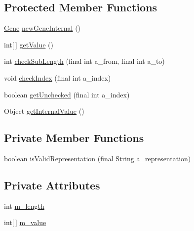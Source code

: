 \subsection*{Protected Member Functions}
\begin{DoxyCompactItemize}
\item 
\hyperlink{interfaceorg_1_1jgap_1_1_gene}{Gene} \hyperlink{classorg_1_1jgap_1_1impl_1_1_fixed_binary_gene_acf83c8bd879cbbcf3e091eaf718594be}{new\-Gene\-Internal} ()
\item 
int\mbox{[}$\,$\mbox{]} \hyperlink{classorg_1_1jgap_1_1impl_1_1_fixed_binary_gene_aeced77e3bafb3ffcbad495031e8566cd}{get\-Value} ()
\item 
int \hyperlink{classorg_1_1jgap_1_1impl_1_1_fixed_binary_gene_af37b97db39e23dda57af35e144d54468}{check\-Sub\-Length} (final int a\-\_\-from, final int a\-\_\-to)
\item 
void \hyperlink{classorg_1_1jgap_1_1impl_1_1_fixed_binary_gene_a605be07294785daba606e05229769439}{check\-Index} (final int a\-\_\-index)
\item 
boolean \hyperlink{classorg_1_1jgap_1_1impl_1_1_fixed_binary_gene_a0565a6731613027e86e6df8f6579057d}{get\-Unchecked} (final int a\-\_\-index)
\item 
Object \hyperlink{classorg_1_1jgap_1_1impl_1_1_fixed_binary_gene_a9c3d7ad5bd78dbdf8b6c17278fe14f11}{get\-Internal\-Value} ()
\end{DoxyCompactItemize}
\subsection*{Private Member Functions}
\begin{DoxyCompactItemize}
\item 
boolean \hyperlink{classorg_1_1jgap_1_1impl_1_1_fixed_binary_gene_acc6c9d07a91a81cbe8790928ba6d7867}{is\-Valid\-Representation} (final String a\-\_\-representation)
\end{DoxyCompactItemize}
\subsection*{Private Attributes}
\begin{DoxyCompactItemize}
\item 
int \hyperlink{classorg_1_1jgap_1_1impl_1_1_fixed_binary_gene_a6cda273e9ee2b41cb4833b5f9f934846}{m\-\_\-length}
\item 
int\mbox{[}$\,$\mbox{]} \hyperlink{classorg_1_1jgap_1_1impl_1_1_fixed_binary_gene_a62abc1f750a00d427ac9a715d11fee42}{m\-\_\-value}
\end{DoxyCompactItemize}

